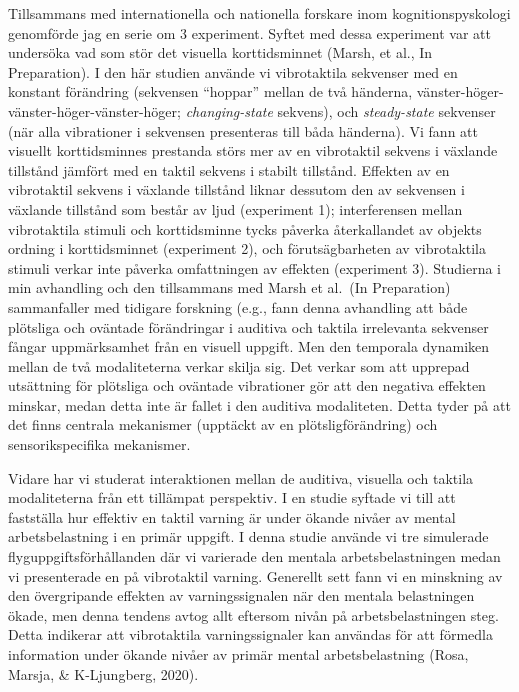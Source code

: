 \documentclass[]{article}
\begin{document}
Tillsammans med internationella och nationella forskare inom
kognitionspyskologi genomförde jag en serie om 3 experiment. Syftet med
dessa experiment var att undersöka vad som stör det visuella
korttidsminnet (Marsh, et al., In Preparation). I den här studien
använde vi vibrotaktila sekvenser med en konstant förändring (sekvensen
``hoppar'' mellan de två händerna,
vänster-höger-vänster-höger-vänster-höger; \emph{changing-state}
sekvens), och \emph{steady-state} sekvenser (när alla vibrationer i
sekvensen presenteras till båda händerna). Vi fann att visuellt
korttidsminnes prestanda störs mer av en vibrotaktil sekvens i växlande
tillstånd jämfört med en taktil sekvens i stabilt tillstånd. Effekten av
en vibrotaktil sekvens i växlande tillstånd liknar dessutom den av
sekvensen i växlande tillstånd som består av ljud (experiment 1);
interferensen mellan vibrotaktila stimuli och korttidsminne tycks
påverka återkallandet av objekts ordning i korttidsminnet (experiment
2), och förutsägbarheten av vibrotaktila stimuli verkar inte påverka
omfattningen av effekten (experiment 3). Studierna i min avhandling och
den tillsammans med Marsh et al.~(In Preparation) sammanfaller med
tidigare forskning (e.g., fann denna avhandling att både plötsliga och
oväntade förändringar i auditiva och taktila irrelevanta sekvenser
fångar uppmärksamhet från en visuell uppgift. Men den temporala
dynamiken mellan de två modaliteterna verkar skilja sig. Det verkar som
att upprepad utsättning för plötsliga och oväntade vibrationer gör att
den negativa effekten minskar, medan detta inte är fallet i den auditiva
modaliteten. Detta tyder på att det finns centrala mekanismer (upptäckt
av en plötsligförändring) och sensorikspecifika mekanismer.

Vidare har vi studerat interaktionen mellan de auditiva, visuella och
taktila modaliteterna från ett tillämpat perspektiv. I en studie syftade
vi till att fastställa hur effektiv en taktil varning är under ökande
nivåer av mental arbetsbelastning i en primär uppgift. I denna studie
använde vi tre simulerade flyguppgiftsförhållanden där vi varierade den
mentala arbetsbelastningen medan vi presenterade en på vibrotaktil
varning. Generellt sett fann vi en minskning av den övergripande
effekten av varningssignalen när den mentala belastningen ökade, men
denna tendens avtog allt eftersom nivån på arbetsbelastningen steg.
Detta indikerar att vibrotaktila varningssignaler kan användas för att
förmedla information under ökande nivåer av primär mental
arbetsbelastning (Rosa, Marsja, \& K-Ljungberg, 2020).
\end{document}
